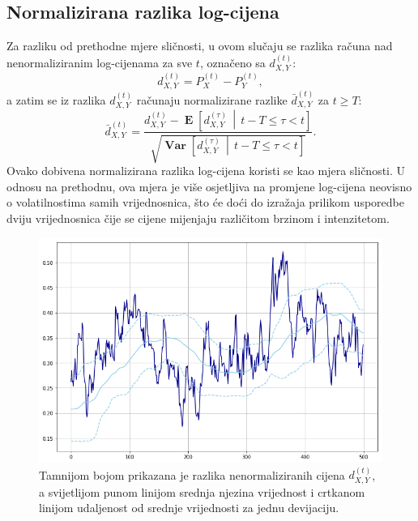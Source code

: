 \documentclass[lmodern, utf8, diplomski, numeric]{fer}
\newcommand{\Efromto}[2]{\operatorname{\mathbf{E}}\left[#1\, \middle\vert\, #2\right]}
\newcommand{\Varfromto}[2]{\operatorname{\mathbf{Var}}\left[#1\, \middle\vert\, #2\right]}
\newcommand{\norm}[1]{\bar{#1}}
\begin{document}
  \subsection{Normalizirana razlika log-cijena}
  Za razliku od prethodne mjere sličnosti, u ovom slučaju se razlika računa nad nenormaliziranim log-cijenama za sve $t$, označeno sa $d_{X,Y}^{\left(t\right)}$:
  \begin{equation}
  d_{X,Y}^{\left(t\right)} = P_X^{\left(t\right)} - P_Y^{\left(t\right)},
  \end{equation}
  a zatim se iz razlika $d_{X,Y}^{\left(t\right)}$ računaju normalizirane razlike $\norm{d}_{X,Y}^{\left(t\right)}$ za $t \ge T$:
  \begin{equation}
  \norm{d}_{X,Y}^{\left(t\right)} = \frac{d_{X,Y}^{\left(t\right)} - \Efromto{d_{X,Y}^{(\tau)}}{t-T \le \tau < t}}{\sqrt{\Varfromto{d_{X,Y}^{(\tau)}}{t-T \le \tau < t}}}.
  \end{equation}
  Ovako dobivena normalizirana razlika log-cijena koristi se kao mjera sličnosti.
  U odnosu na prethodnu, ova mjera je više osjetljiva na promjene log-cijena neovisno o volatilnostima samih vrijednosnica, što će doći do izražaja prilikom usporedbe dviju vrijednosnica čije se cijene mijenjaju različitom brzinom i intenzitetom.
  
  \begin{figure}[H]
    \centering
    \includegraphics[width=1.0\linewidth]{graphics/diff.png}
    \caption{Tamnijom bojom prikazana je razlika nenormaliziranih cijena $d_{X,Y}^{(t)}$, a svijetlijom punom linijom srednja njezina vrijednost i crtkanom linijom udaljenost od srednje vrijednosti za jednu devijaciju.}
  \end{figure}
\end{document}
